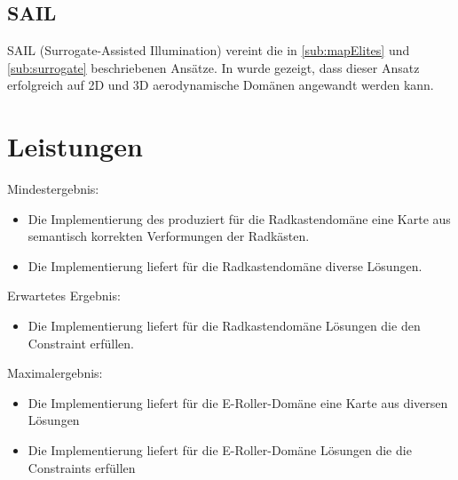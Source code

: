 \documentclass[12pt]{article}
\begin{document}
\subsection{SAIL}

SAIL (Surrogate-Assisted Illumination) vereint die in \ref{sub:mapElites} und \ref{sub:surrogate} beschriebenen Ansätze.
In \cite{Gaier.6152018} wurde gezeigt, dass dieser Ansatz erfolgreich auf 2D und 3D aerodynamische Domänen angewandt werden kann.

\section{Leistungen}
Mindestergebnis:
\begin{itemize}  
\item Die Implementierung des produziert für die Radkastendomäne eine Karte aus semantisch korrekten Verformungen der Radkästen.
\item Die Implementierung liefert für die Radkastendomäne diverse Lösungen.
\end{itemize}
Erwartetes Ergebnis:
\begin{itemize}  
\item  Die Implementierung liefert für die Radkastendomäne Lösungen die den Constraint erfüllen.
\end{itemize}
Maximalergebnis:
\begin{itemize}  
\item Die Implementierung liefert für die E-Roller-Domäne eine Karte aus diversen Lösungen
\item Die Implementierung liefert für die E-Roller-Domäne Lösungen die die Constraints erfüllen
\end{itemize}

\newpage{}

\end{document}
